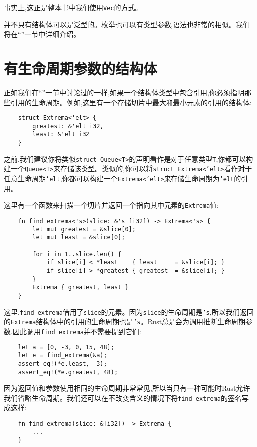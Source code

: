 事实上,这正是整本书中我们使用\texttt{Vec}的方式。

并不只有结构体可以是泛型的。枚举也可以有类型参数,语法也非常的相似。我们将在“”一节中详细介绍。

\section{有生命周期参数的结构体}

正如我们在“”一节中讨论过的一样,如果一个结构体类型中包含引用,你必须指明那些引用的生命周期。例如,这里有一个存储切片中最大和最小元素的引用的结构体:
\begin{verbatim}
    struct Extrema<'elt> {
        greatest: &'elt i32,
        least: &'elt i32
    }
\end{verbatim}

之前,我们建议你将类似\texttt{struct Queue<T>}的声明看作是对于任意类型\texttt{T},你都可以构建一个\texttt{Queue<T>}来存储该类型。类似的,你可以将\texttt{struct Extrema<'elt>}看作对于任意生命周期\texttt{'elt},你都可以构建一个\texttt{Extrema<'elt>}来存储生命周期为\texttt{'elt}的引用。

这里有一个函数来扫描一个切片并返回一个指向其中元素的\texttt{Extrema}值:
\begin{verbatim}
    fn find_extrema<'s>(slice: &'s [i32]) -> Extrema<'s> {
        let mut greatest = &slice[0];
        let mut least = &slice[0];

        for i in 1..slice.len() {
            if slice[i] < *least    { least     = &slice[i]; }
            if slice[i] > *greatest { greatest  = &slice[i]; }
        }
        Extrema { greatest, least }
    }
\end{verbatim}

这里,\texttt{find\_extrema}借用了\texttt{slice}的元素。因为\texttt{slice}的生命周期是\texttt{'s},所以我们返回的\texttt{Extrema}结构体中的引用的生命周期也是\texttt{'s}。Rust总是会为调用推断生命周期参数,因此调用\texttt{find\_extrema}并不需要提到它们:
\begin{verbatim}
    let a = [0, -3, 0, 15, 48];
    let e = find_extrema(&a);
    assert_eq!(*e.least, -3);
    assert_eq!(*e.greatest, 48);
\end{verbatim}

因为返回值和参数使用相同的生命周期非常常见,所以当只有一种可能时Rust允许我们省略生命周期。我们还可以在不改变含义的情况下将\texttt{find\_extrema}的签名写成这样:
\begin{verbatim}
    fn find_extrema(slice: &[i32]) -> Extrema {
        ...
    }
\end{verbatim}

